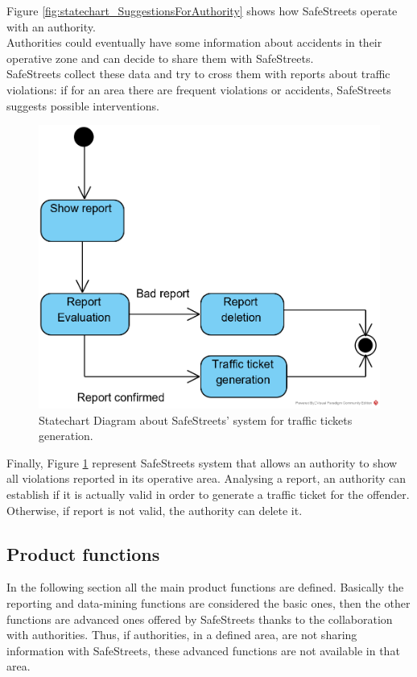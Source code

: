 \documentclass{article}
\begin{document}
			Figure \ref{fig:statechart_SuggestionsForAuthority} shows how SafeStreets operate with an authority.\\
			Authorities could eventually have some information about accidents in their operative zone and can decide to share them with SafeStreets.\\
			SafeStreets collect these data and try to cross them with reports about traffic violations: if for an area there are frequent violations or accidents, SafeStreets suggests possible interventions.
			
			\begin{figure}[H]
				\centering
				\includegraphics {diagrams/statechart_trafficTicket.png}
				\caption[Statechart Diagram3]{Statechart Diagram about SafeStreets' system for traffic tickets generation.}
				\label{fig:statechart_trafficTickets}
			\end{figure}
			
			Finally, Figure \ref{fig:statechart_trafficTickets} represent SafeStreets system that allows an authority to show all violations reported in its operative area. Analysing a report, an authority can establish if it is actually valid in order to generate a traffic ticket for the offender. Otherwise, if report is not valid, the authority can delete it.
			
			\clearpage	   
	
		\subsection{Product functions}
			In the following section all the main product functions are defined. Basically the reporting and data-mining functions are considered the basic ones, then the other functions are advanced ones offered by SafeStreets thanks to the collaboration with authorities. Thus, if authorities, in a defined area, are not sharing information with SafeStreets, these advanced functions are not available in that area.
\end{document}
